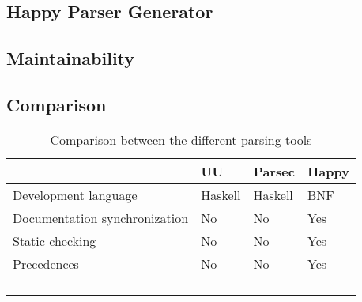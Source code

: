 


\subsection{Happy Parser Generator}
%

\subsection{Maintainability}

\subsection{Comparison}
\begin{longtable}{|l|l|l|l|}\hline
	\textbf{} & \textbf{UU} & \textbf{Parsec} & \textbf{Happy} \\\hline
	\endhead
	
	Development language 	  & Haskell & Haskell & BNF \\\hline
	Documentation synchronization  & No & No & Yes \\\hline
	Static checking			  & No & No & Yes \\\hline
	Precedences & No & No & Yes \\\hline
	 & & & \\\hline
	 & & & \\\hline
	 & & & \\\hline
	
	\caption{Comparison between the different parsing tools}
	\label{tab:comparison}
\end{longtable}

